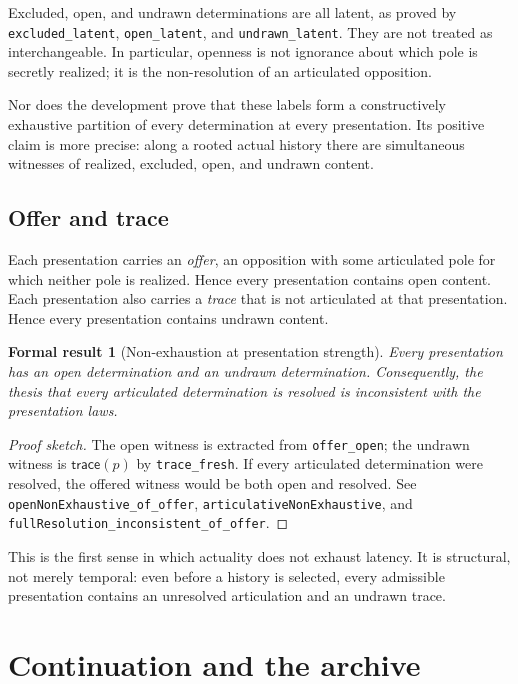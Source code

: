 \documentclass[11pt]{article}
\newtheorem{formalresult}{Formal result}[section]
\theoremstyle{definition}
\theoremstyle{remark}
\newcommand{\lean}[1]{\nolinkurl{#1}}
\newcommand{\Trace}{\mathsf{trace}}
\begin{document}
Excluded, open, and undrawn determinations are all latent, as proved by
\lean{excluded_latent}, \lean{open_latent}, and \lean{undrawn_latent}. They are
not treated as interchangeable. In particular, openness is not ignorance about
which pole is secretly realized; it is the non-resolution of an articulated
opposition.

Nor does the development prove that these labels form a constructively
exhaustive partition of every determination at every presentation. Its
positive claim is more precise: along a rooted actual history there are
simultaneous witnesses of realized, excluded, open, and undrawn content.

\subsection{Offer and trace}

Each presentation carries an \emph{offer}, an opposition with some articulated
pole for which neither pole is realized. Hence every presentation contains
open content. Each presentation also carries a \emph{trace} that is not
articulated at that presentation. Hence every presentation contains undrawn
content.

\begin{formalresult}[Non-exhaustion at presentation strength]
Every presentation has an open determination and an undrawn determination.
Consequently, the thesis that every articulated determination is resolved is
inconsistent with the presentation laws.
\end{formalresult}

\begin{proof}[Proof sketch]
The open witness is extracted from \lean{offer_open}; the undrawn witness is
\(\Trace(p)\) by \lean{trace_fresh}. If every articulated determination were
resolved, the offered witness would be both open and resolved. See
\lean{openNonExhaustive_of_offer},
\lean{articulativeNonExhaustive}, and
\lean{fullResolution_inconsistent_of_offer}.
\end{proof}

This is the first sense in which actuality does not exhaust latency. It is
structural, not merely temporal: even before a history is selected, every
admissible presentation contains an unresolved articulation and an undrawn
trace.

\section{Continuation and the archive}
\end{document}
